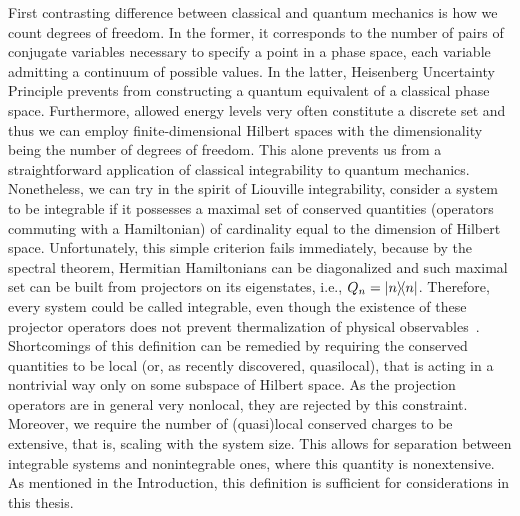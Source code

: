 First contrasting difference between classical and quantum mechanics is how we count
degrees of freedom. In the former, it corresponds to the number of pairs of conjugate variables
necessary to specify a point in a phase space, each variable admitting a continuum of 
possible values. In the latter, Heisenberg Uncertainty Principle prevents from 
constructing a quantum equivalent of a classical phase space. Furthermore, allowed energy
levels very often constitute a discrete set and thus we can employ finite-dimensional
Hilbert spaces with the dimensionality being the number of degrees of freedom.
This alone prevents us from a straightforward application of classical integrability to quantum
mechanics. Nonetheless, we can try in the spirit of Liouville integrability, consider
a system to be integrable if it possesses a maximal set of conserved quantities 
(operators commuting with a Hamiltonian) of cardinality
equal to the dimension of Hilbert space. Unfortunately, this simple criterion fails immediately,
because by the spectral theorem, Hermitian Hamiltonians can be diagonalized and such
maximal set can be built from projectors on its eigenstates, i.e., \(Q_{n} = \ketbra{n}{n}\).
Therefore, every system could be called integrable, even though the existence of these projector
operators does not prevent thermalization of physical observables~\autocite{DAlessio2016}.
Shortcomings of this definition can be remedied by requiring the conserved quantities
to be local (or, as recently discovered, quasilocal), that is acting in a nontrivial way
only on some subspace of Hilbert space. As the projection operators are in general very nonlocal,
they are rejected by this constraint. Moreover, we require the number of (quasi)local conserved
charges to be extensive, that is, scaling with the system size. This allows for 
separation between integrable systems and nonintegrable ones, where this quantity is nonextensive.
As mentioned in the Introduction, this definition is sufficient for considerations in this
thesis.

